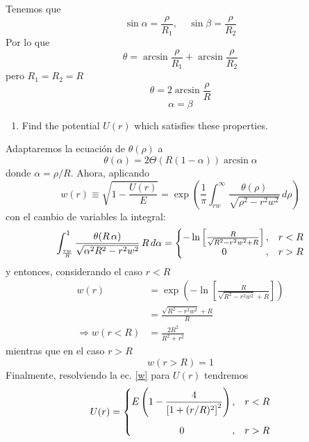 \documentclass[]{article}
\numberwithin{equation}{section}
\newcommand{\0}{\textcolor{gray}{0}}
\begin{document}
Tenemos que
\begin{equation}
	\sin\alpha = \frac{\rho}{R_{1}}, ~~~~~ \sin\beta = \frac{\rho}{R_{2}}
\end{equation}
Por lo que
\begin{equation*}
	\theta = \arcsin\frac{\rho}{R_{1}} + \arcsin\frac{\rho}{R_{2}}
\end{equation*}
pero \(R_{1} = R_{2} = R\)
\begin{equation}
	\theta = 2 \arcsin\frac{\rho}{R} \label{theta}
\end{equation}
\begin{equation}
	\alpha = \beta
\end{equation}


\begin{enumerate}
	\item[\textbf{b.}] Find the potential \(U(r)\) which satisfies these properties.
\end{enumerate}

Adaptaremos la ecuación de \(\theta(\rho)\) a
\begin{equation}
	\theta(\alpha) = 2 \Theta(R(1-\alpha))\arcsin\alpha
\end{equation}
donde \(\alpha = \rho / R\). Ahora, aplicando
\begin{equation}
	w(r) \equiv \sqrt{1 - \frac{U(r)}{E} } = \exp\left( \frac{1}{\pi } \int_{r w}^{\infty} \frac{\theta (\rho)}{\sqrt{\rho^2 - r^2 w^2} } \, d\rho \right) \label{w}
\end{equation}
con el cambio de variables la integral:
\begin{equation}
	\int_{\frac{r w}{R}}^1 \frac{\theta (R \,\alpha)}{\sqrt{\alpha ^2 R^2-r^2 w^2}} \, R \, d\alpha = \left\lbrace \begin{matrix}
		-\ln\left[\frac{R}{\sqrt{R^2-r^2 w^2}+R}\right], & r < R\\
		\hfill 0 \hfill, & r > R
	\end{matrix}\right.
\end{equation}
y entonces, considerando el caso \(r < R\)
\begin{align}
	w(r) &= \exp \left(-\ln\left[\frac{R}{\sqrt{R^2-r^2 w^2}+R}\right]\right)\nonumber\\
	&= \frac{\sqrt{R^2-r^2 w^2}+R}{R}\nonumber\\
	\Rightarrow w(r < R) &= \frac{2 R^2}{R^2 + r^2}
\end{align}
mientras que en el caso \(r > R\)
\begin{equation}
	w(r > R) = 1
\end{equation}
Finalmente, resolviendo la ec. \ref{w} para \(U(r)\) tendremos
\begin{equation}
	U(r) = \left\lbrace \begin{matrix}
		E \left(1 - \dfrac{4}{\left[1 + (r/R)^2\right]^2}\right), & r < R \vspace{3mm}\\
		\hfill 0 \hfill, & r > R
	\end{matrix}\right.
\end{equation}
\end{document}
